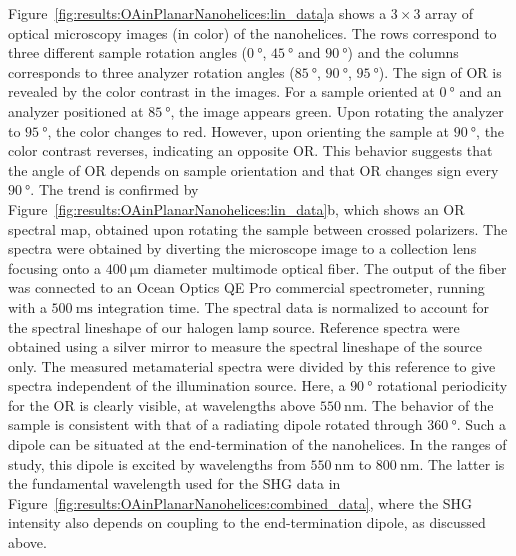 Figure~\ref{fig:results:OAinPlanarNanohelices:lin_data}a shows a $3 \times 3$ array of optical microscopy images (in color) of the nanohelices. The rows correspond to three different sample rotation angles ($\SI{0}{\degree}$, $\SI{45}{\degree}$ and $\SI{90}{\degree}$) and the columns corresponds to three analyzer rotation angles ($\SI{85}{\degree}$, $\SI{90}{\degree}$, $\SI{95}{\degree}$).
The sign of OR is revealed by the color contrast in the images. For a sample oriented at $\SI{0}{\degree}$ and an analyzer positioned at $\SI{85}{\degree}$, the image appears green.
Upon rotating the analyzer to $\SI{95}{\degree}$, the color changes to red. However, upon orienting the sample at $\SI{90}{\degree}$, the color contrast reverses, indicating an opposite OR. This behavior suggests that the angle of OR depends on sample orientation and that OR changes sign every $\SI{90}{\degree}$. 
The trend is confirmed by Figure~\ref{fig:results:OAinPlanarNanohelices:lin_data}b, which shows an OR spectral map, obtained upon rotating the sample between crossed polarizers. 
The spectra were obtained by diverting the microscope image to a collection lens focusing onto a $\SI{400}{\micro\m}$ diameter multimode optical fiber. The output of the fiber was connected to an Ocean Optics QE Pro commercial spectrometer, running with a $\SI{500}{\milli\s}$ integration time. The spectral data is normalized to account for the spectral lineshape of our halogen lamp source. Reference spectra were obtained using a silver mirror to measure the spectral lineshape of the source only. The measured metamaterial spectra were divided by this reference to give spectra independent of the illumination source.
Here, a $\SI{90}{\degree}$ rotational periodicity for the OR is clearly visible, at wavelengths above $\SI{550}{\nano\m}$. The behavior of the sample is consistent with that of a radiating dipole rotated through $\SI{360}{\degree}$. Such a dipole can be situated at the end-termination of the nanohelices. In the ranges of study, this dipole is excited by wavelengths from $\SI{550}{\nano\m}$ to $\SI{800}{\nano\m}$. The latter is the fundamental wavelength used for the SHG data in Figure~\ref{fig:results:OAinPlanarNanohelices:combined_data}, where the SHG intensity also depends on coupling to the end-termination dipole, as discussed above.

